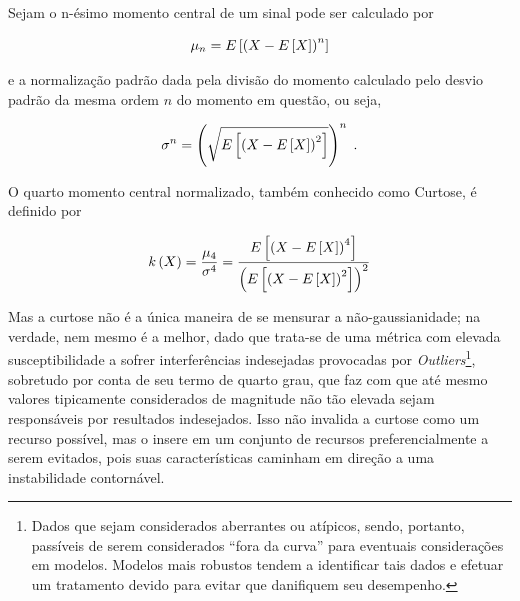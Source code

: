 \begin{definition}[Curtose]
    Sejam o n-ésimo momento central de um sinal pode ser calculado por

    \begin{equation}
        \mu_{n} = E\left[\left(X - E\left[X\right]\right)^{n}\right]
        \vspace{0.2cm}
    \end{equation}

    \noindent e a normalização padrão dada pela divisão do momento calculado pelo desvio padrão da mesma ordem $n$ do momento em questão, ou seja,

    \begin{equation}
        \sigma^{n} = \left(\sqrt{E\left[\left(X - E\left[X\right]\right)^{2}\right]}\right)^{n}
        \hspace{0.1cm}.
        \vspace{0.2cm}
    \end{equation}

    O quarto momento central normalizado, também conhecido como Curtose, é definido por

    \begin{equation}
        k\left(X\right) = \dfrac{\mu_{4}}{\sigma^{4}} = \dfrac{E\left[\left(X - E\left[X\right]\right)^{4}\right]}{\left(E\left[\left(X - E\left[X\right]\right)^{2}\right]\right)^{2}}
        \vspace{0.2cm}
    \label{eq:bss_curtose}
    \end{equation}

\end{definition}


Mas a curtose não é a única maneira de se mensurar a não-gaussianidade; na verdade, nem mesmo é a melhor, dado que trata-se de uma métrica com elevada susceptibilidade a sofrer interferências indesejadas provocadas por \textit{Outliers}\footnote{Dados que sejam considerados aberrantes ou atípicos, sendo, portanto, passíveis de serem considerados ``fora da curva'' para eventuais considerações em modelos. Modelos mais robustos tendem a identificar tais dados e efetuar um tratamento devido para evitar que danifiquem seu desempenho.}, sobretudo por conta de seu termo de quarto grau, que faz com que até mesmo valores tipicamente considerados de magnitude não tão elevada sejam responsáveis por resultados indesejados. Isso não invalida a curtose como um recurso possível, mas o insere em um conjunto de recursos preferencialmente a serem evitados, pois suas características caminham em direção a uma instabilidade contornável.

